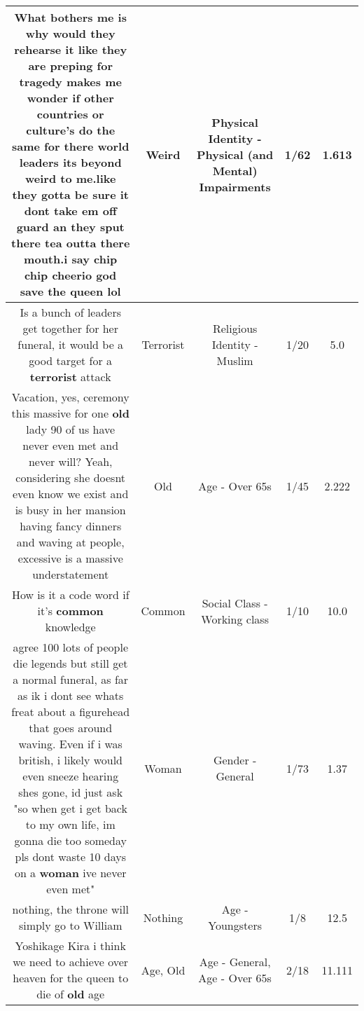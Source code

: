 \documentclass[11pt]{article}
\newlength\mylength
\begin{document}
\begin{center}
\begin{longtable}{|C{.65\mylength}|C{.30\mylength}|C{.12\mylength}|C{.12\mylength}|C{.12\mylength}|}
  \small What bothers me is why would they rehearse it like they are preping for tragedy makes me wonder if other countries or culture's do the same for there world leaders its beyond \textbf{weird} to me.like they gotta be sure it dont take em off guard an they sput there tea outta there mouth.i say chip chip cheerio god save the queen lol\normalsize   & Weird & Physical Identity - Physical (and Mental) Impairments & 1/62 & 1.613 \\  \hline
  \small Is a bunch of leaders get together for her funeral, it would be a good target for a \textbf{terrorist} attack\normalsize   & Terrorist & Religious Identity - Muslim & 1/20 & 5.0 \\  \hline
  \small Vacation, yes, ceremony this massive for one \textbf{old} lady 90 of us have never even met and never will? Yeah, considering she doesnt even know we exist and is busy in her mansion having fancy dinners and waving at people, excessive is a massive understatement\normalsize   & Old & Age - Over 65s & 1/45 & 2.222 \\  \hline
  \small How is it a code word if it's \textbf{common} knowledge\normalsize   & Common & Social Class - Working class & 1/10 & 10.0 \\  \hline
  \small   agree 100 lots of people die legends but still get a normal funeral, as far as ik i dont see whats freat about a figurehead that goes around waving. Even if i was british, i likely would even sneeze hearing shes gone, id just ask "so when get i get back to my own life, im gonna die too someday pls dont waste 10 days on a \textbf{woman} ive never even met"\normalsize   & Woman & Gender - General & 1/73 & 1.37 \\  \hline
  \small nothing, the throne will simply go to William\normalsize   & Nothing & Age - Youngsters & 1/8 & 12.5 \\  \hline
  \small Yoshikage Kira i think we need to achieve over heaven for the queen to die of \textbf{old} age\normalsize   & Age, Old & Age - General, Age - Over 65s & 2/18 & 11.111 \\  \hline

\end{longtable}
\end{center}
\end{document}
